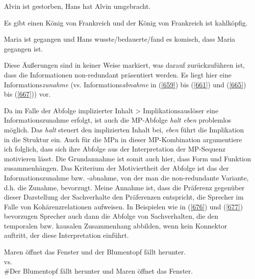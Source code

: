 \begin{exe}
	\ex\label{673} 
	Alvin ist gestorben, Hans hat Alvin umgebracht.
\end{exe}
	
\begin{exe}
	\ex\label{674} 
	Es gibt einen König von Frankreich und der König von Frankreich ist kahlköpfig.
\end{exe}

\begin{exe}
	\ex\label{675} 
	Maria ist gegangen und Hans wusste/bedauerte/fand es komisch, dass Maria gegangen ist.
\end{exe}
Diese Äußerungen sind in keiner Weise markiert, was darauf zurückzuführen ist, dass die Informationen non-redundant präsentiert werden. Es liegt hier eine Informations\emph{zunahme} (vs. Informations\emph{abnahme} in (\ref{659}) bis (\ref{661}) und (\ref{665}) bis (\ref{667})) vor.

Da im Falle der Abfolge implizierter Inhalt > Implikationsauslöser eine Informationszunahme erfolgt, ist auch die MP-Abfolge \textit{halt eben} problemlos möglich. Das \textit{halt} steuert den implizierten Inhalt bei, \textit{eben} führt die Implikation in die Struktur ein. Auch für die MPn in dieser MP-Kombination argumentiere ich folg\-lich, dass sich ihre Abfolge aus der Interpretation der MP-Sequenz motivieren lässt. Die Grundannahme ist somit auch hier, dass Form und Funktion zusammenhängen. Das Kriterium der Motiviertheit der Abfolge ist das der Informati\-onszunahme bzw. -abnahme, von der man die non-redundante Variante, d.h. die Zunahme, bevorzugt. Meine Annahme ist, dass die Präferenz gegenüber dieser Darstellung der Sachverhalte den Präferenzen entspricht, die Sprecher im Falle von Kohärenzrelationen  aufweisen. In Beispielen wie in (\ref{676}) und (\ref{677}) bevorzugen Sprecher auch dann die Abfolge von Sachverhalten, die den temporalen bzw. kausalen Zusammenhang abbilden, wenn kein Konnektor auftritt, der diese Interpretation einführt.

\begin{exe}
	\ex\label{676} 
	Maren öffnet das Fenster und der Blumentopf fällt herunter.\\
	vs.\\
	\#Der Blumentopf fällt herunter und Maren öffnet das Fenster.
\end{exe}

